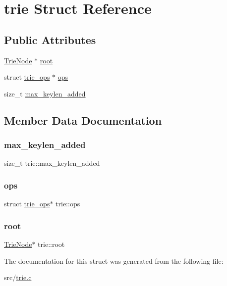 \hypertarget{structtrie}{}\section{trie Struct Reference}
\label{structtrie}
\subsection*{Public Attributes}
\begin{DoxyCompactItemize}
\item 
\mbox{\hyperlink{trie_8c_aede21e1205c7ee95ed9aa6db21863c00}{Trie\+Node}} $\ast$ \mbox{\hyperlink{structtrie_a1609e8af6e239efe0185d0009bde08fa}{root}}
\item 
struct \mbox{\hyperlink{structtrie__ops}{trie\+\_\+ops}} $\ast$ \mbox{\hyperlink{structtrie_a06e66563893e1fab35731eeb1522ea4a}{ops}}
\item 
size\+\_\+t \mbox{\hyperlink{structtrie_a32fe8ee6c9099ceca4ea003420eb5870}{max\+\_\+keylen\+\_\+added}}
\end{DoxyCompactItemize}


\subsection{Member Data Documentation}
\mbox{\label{structtrie_a32fe8ee6c9099ceca4ea003420eb5870}} 
\subsubsection{\texorpdfstring{max\_keylen\_added}{max\_keylen\_added}}
{\footnotesize\ttfamily size\+\_\+t trie\+::max\+\_\+keylen\+\_\+added}

\mbox{\label{structtrie_a06e66563893e1fab35731eeb1522ea4a}} 
\subsubsection{\texorpdfstring{ops}{ops}}
{\footnotesize\ttfamily struct \mbox{\hyperlink{structtrie__ops}{trie\+\_\+ops}}$\ast$ trie\+::ops}

\mbox{\label{structtrie_a1609e8af6e239efe0185d0009bde08fa}} 
\subsubsection{\texorpdfstring{root}{root}}
{\footnotesize\ttfamily \mbox{\hyperlink{trie_8c_aede21e1205c7ee95ed9aa6db21863c00}{Trie\+Node}}$\ast$ trie\+::root}



The documentation for this struct was generated from the following file\+:\begin{DoxyCompactItemize}
\item 
src/\mbox{\hyperlink{trie_8c}{trie.\+c}}\end{DoxyCompactItemize}
